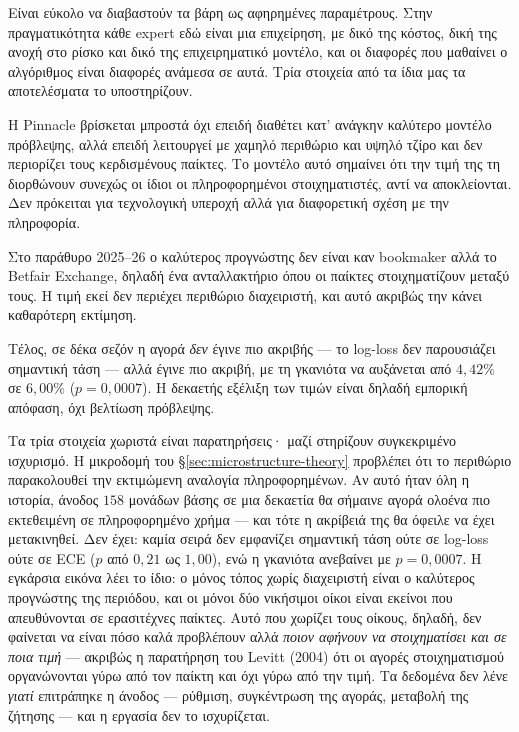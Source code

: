 \documentclass[12pt,a4paper,oneside]{report}
\renewcommand{\_}{\oldunderscore\allowbreak}
\theoremstyle{definition}
\theoremstyle{plain}
\theoremstyle{remark}
\begin{document}
Είναι εύκολο να διαβαστούν τα βάρη ως αφηρημένες παραμέτρους. Στην πραγματικότητα κάθε expert
εδώ είναι μια επιχείρηση, με δικό της κόστος, δική της ανοχή στο ρίσκο και δικό της
επιχειρηματικό μοντέλο, και οι διαφορές που μαθαίνει ο αλγόριθμος είναι διαφορές ανάμεσα σε
αυτά. Τρία στοιχεία από τα ίδια μας τα αποτελέσματα το υποστηρίζουν.

Η Pinnacle βρίσκεται μπροστά όχι επειδή διαθέτει κατ' ανάγκην καλύτερο μοντέλο πρόβλεψης,
αλλά επειδή λειτουργεί με χαμηλό περιθώριο και υψηλό τζίρο και δεν περιορίζει τους
κερδισμένους παίκτες. Το μοντέλο αυτό σημαίνει ότι την τιμή της τη διορθώνουν συνεχώς οι
ίδιοι οι πληροφορημένοι στοιχηματιστές, αντί να αποκλείονται. Δεν πρόκειται για τεχνολογική
υπεροχή αλλά για διαφορετική σχέση με την πληροφορία.

Στο παράθυρο 2025--26 ο καλύτερος προγνώστης δεν είναι καν bookmaker αλλά το Betfair
Exchange, δηλαδή ένα ανταλλακτήριο όπου οι παίκτες στοιχηματίζουν μεταξύ τους. Η τιμή εκεί
δεν περιέχει περιθώριο διαχειριστή, και αυτό ακριβώς την κάνει καθαρότερη εκτίμηση.

Τέλος, σε δέκα σεζόν η αγορά \emph{δεν} έγινε πιο ακριβής --- το log-loss δεν παρουσιάζει
σημαντική τάση --- αλλά έγινε πιο ακριβή, με τη γκανιότα να αυξάνεται από $4{,}42\%$ σε
$6{,}00\%$ ($p=0{,}0007$). Η δεκαετής εξέλιξη των τιμών είναι δηλαδή εμπορική απόφαση, όχι
βελτίωση πρόβλεψης.

Τα τρία στοιχεία χωριστά είναι παρατηρήσεις· μαζί στηρίζουν συγκεκριμένο ισχυρισμό. Η
μικροδομή του \S\ref{sec:microstructure-theory} προβλέπει ότι το περιθώριο παρακολουθεί την
εκτιμώμενη αναλογία πληροφορημένων. Αν αυτό ήταν όλη η ιστορία, άνοδος $158$ μονάδων βάσης σε
μια δεκαετία θα σήμαινε αγορά ολοένα πιο εκτεθειμένη σε πληροφορημένο χρήμα --- και τότε η
ακρίβειά της θα όφειλε να έχει μετακινηθεί. Δεν έχει: καμία σειρά δεν εμφανίζει σημαντική
τάση ούτε σε log-loss ούτε σε ECE ($p$ από $0{,}21$ ως $1{,}00$), ενώ η γκανιότα ανεβαίνει με
$p=0{,}0007$. Η εγκάρσια εικόνα λέει το ίδιο: ο μόνος τόπος χωρίς διαχειριστή είναι ο
καλύτερος προγνώστης της περιόδου, και οι μόνοι δύο νικήσιμοι οίκοι είναι εκείνοι που
απευθύνονται σε ερασιτέχνες παίκτες. Αυτό που χωρίζει τους οίκους, δηλαδή, δεν φαίνεται να
είναι πόσο καλά προβλέπουν αλλά \emph{ποιον αφήνουν να στοιχηματίσει και σε ποια τιμή} ---
ακριβώς η παρατήρηση του Levitt (2004) ότι οι αγορές στοιχηματισμού οργανώνονται γύρω από τον
παίκτη και όχι γύρω από την τιμή. Τα δεδομένα δεν λένε \emph{γιατί} επιτράπηκε η άνοδος
--- ρύθμιση, συγκέντρωση της αγοράς, μεταβολή της ζήτησης --- και η εργασία δεν το
ισχυρίζεται.
\end{document}

